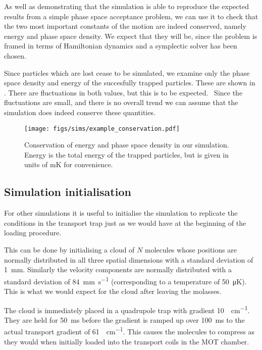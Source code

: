 As well as demonstrating that the simulation is able to reproduce the expected
results from a simple phase space acceptance problem, we can use it to check
that the two most important constants of the motion are indeed conserved,
namely energy and phase space density. We expect that they will be, since the
problem is framed in terms of Hamiltonian dynamics and a symplectic solver has
been chosen.

Since particles which are lost cease to be simulated, we examine only the phase
space density and energy of the succesfully trapped particles. These are shown
in . There are fluctuations in both
values, but this is to be expected.~\cite{doi:10.1119/1.2034523} Since the
fluctuations are small, and there is no overall trend we can assume that the
simulation does indeed conserve these quantities.

\begin{figure}
  \centering
  \texttt{[image: figs/sims/example\_conservation.pdf]}
  \caption{Conservation of energy and phase space density in our simulation.
  Energy is the total energy of the trapped particles, but is given in units of
  \si{\milli\kelvin} for convenience.
  }
  \label{design:fig:conservation}
\end{figure}

\subsection{Simulation initialisation}

For other simulations it is useful to initialise the simulation to replicate
the conditions in the transport trap just as we would have at the beginning of
the loading procedure.

This can be done by initialising a cloud of $N$ molecules whose positions are
normally distributed in all three spatial dimensions with a standard deviation
of \SI{1}{\milli\meter}. Similarly the velocity components are normally
distributed with a standard deviation of \SI{84}{\milli\meter\per\second}
(corresponding to a temperature of \SI{50}{\micro\kelvin}). This is what we
would expect for the cloud after leaving the molasses.

The cloud is immediately placed in a quadrupole trap with gradient
\SI{10}{\gauss\per\centi\meter}. They are held for \SI{50}{\milli\second}
before the gradient is ramped up over \SI{100}{\milli\second} to the actual
transport gradient of \SI{61}{\gauss\per\centi\meter}. This causes the
molecules to compress as they would when initially loaded into the transport
coils in the MOT chamber.

